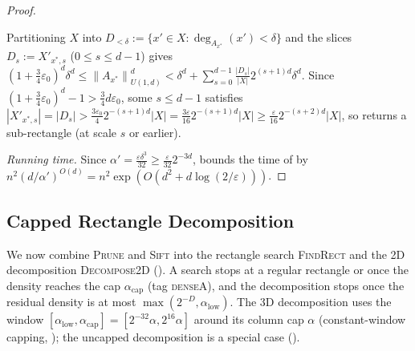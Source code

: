 \documentclass[11pt]{article}
\theoremstyle{definition}
\renewcommand{\label}[1]{}%
\newcommand{\norm}[1]{\left\lVert #1 \right\rVert}
\newcommand{\abs}[1]{\left\lvert #1 \right\rvert}
\newcommand{\Prune}{\textnormal{\textsc{Prune}}}
\newcommand{\Sift}{\textnormal{\textsc{Sift}}}
\newcommand{\FindRect}{\textnormal{\textsc{FindRect}}}
\newcommand{\DecomposeTwoD}{\textnormal{\textsc{Decompose2D}}}
\newcommand{\tagdenseA}{\textnormal{\textsc{denseA}}}
\begin{document}
\begin{proof}
\begin{itemize}[leftmargin=*]
\[    \]
    Partitioning $X$ into $D_{<\delta} := \{x' \in X : \deg_{A_{x^*}}(x') < \delta\}$ and the slices $D_s := X'_{x^*, s}$ ($0 \le s \le d-1$) gives $(1 + \frac{3}{4}\varepsilon_0)^d\delta^d \le \norm{A_{x^*}}_{U(1, d)}^d < \delta^d + \sum_{s=0}^{d-1} \frac{\abs{D_s}}{\abs{X}} 2^{(s+1)d}\delta^d$.
    Since $(1 + \frac{3}{4}\varepsilon_0)^d - 1 > \frac{3}{4}d\varepsilon_0$, some $s \le d-1$ satisfies $\abs{X'_{x^*, s}} = \abs{D_s} > \frac{3\varepsilon_0}{4} 2^{-(s+1)d}\abs{X} = \frac{3\varepsilon}{16} 2^{-(s+1)d}\abs{X} \ge \frac{\varepsilon}{16} 2^{-(s+2)d}\abs{X}$, so  returns a sub-rectangle (at scale $s$ or earlier).
\end{itemize}

\emph{Running time.} Since $\alpha' = \frac{\varepsilon\delta^3}{32} \ge \frac{\varepsilon}{32} 2^{-3d}$,  bounds the time of  by $n^2 (d/\alpha')^{O(d)} = n^2 \exp(O(d^2 + d\log(2/\varepsilon)))$.
\end{proof}

\subsection{Capped Rectangle Decomposition}
\label{sec:2d-decomp}

We now combine \Prune{} and \Sift{} into the rectangle search \FindRect{} and the 2D decomposition \DecomposeTwoD{} (). A search stops at a regular rectangle or once the density reaches the cap $\alpha_{\text{cap}}$ (tag \tagdenseA{}), and the decomposition stops once the residual density is at most $\max(2^{-D}, \alpha_{\text{low}})$. The 3D decomposition uses the window $[\alpha_{\text{low}}, \alpha_{\text{cap}}] = [2^{-32}\alpha, 2^{16}\alpha]$ around its column cap $\alpha$ (constant-window capping, ); the uncapped decomposition is a special case ().
\end{document}
